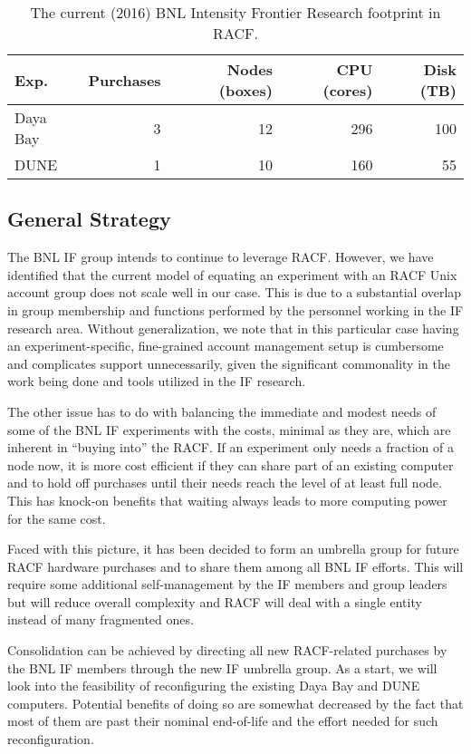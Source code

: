 \documentclass[pdftex,12pt,letter]{article}
\begin{document}
\begin{table}[tbh]
\centering
\begin{tabular}[h]{|l|r|r|r|r|}
  \hline
  Exp. & Purchases & Nodes (boxes) & CPU (cores) & Disk (TB) \\
  \hline
  Daya Bay & 3 & 12 & 296 & 100 \\
  \hline
  DUNE & 1 & 10 & 160 & 55 \\
  \hline
\end{tabular}
\caption{The current (2016) BNL Intensity Frontier Research footprint in RACF.}
\label{tab:bnlif_at_racf_2016}

\end{table}

\subsection{General Strategy}

The BNL IF group intends to continue to leverage RACF.
However, we have identified that the current model of equating an
experiment with an RACF Unix account group does not scale well in our
case. This is due to a substantial overlap in group membership
and functions performed by the personnel working in the IF research area.
Without generalization, we note that in this particular case having an experiment-specific,
fine-grained account management setup is cumbersome and complicates support unnecessarily,
given the significant commonality in the work being done and tools utilized in the IF research.

The other issue has to do with balancing the immediate and modest needs of
some of the BNL IF experiments with the costs, minimal as they are, which are
inherent in ``buying into'' the RACF.
If an experiment only needs a fraction of a node now, it is more cost
efficient if they can share part of an existing computer and to hold
off purchases until their needs reach the level of at least full node.
This has knock-on benefits that waiting always leads to more computing
power for the same cost.

Faced with this picture, it has been decided to form an umbrella group
for future RACF hardware purchases and to share them among all BNL IF
efforts. This will require some additional self-management by the IF members
and group leaders but will reduce overall complexity and RACF will deal
with a single entity instead of many fragmented ones.

Consolidation can be achieved by directing all new RACF-related purchases by
the BNL IF members through the new IF umbrella group. As a start,
we will look into the feasibility of reconfiguring the existing Daya Bay and
DUNE computers. Potential benefits of doing so are somewhat decreased
by the fact that most of them are past their nominal
end-of-life and the effort needed for such reconfiguration.
\end{document}
